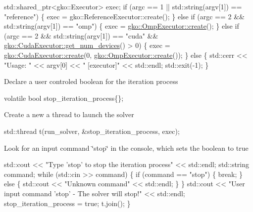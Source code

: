 \begin{DoxyCode}
std::shared\_ptr<gko::Executor> exec;
\textcolor{keywordflow}{if} (argc == 1 || std::string(argv[1]) == \textcolor{stringliteral}{"reference"}) \{
    exec = gko::ReferenceExecutor::create();
\} \textcolor{keywordflow}{else} \textcolor{keywordflow}{if} (argc == 2 && std::string(argv[1]) == \textcolor{stringliteral}{"omp"}) \{
    exec = \hyperlink{classgko_1_1OmpExecutor_a33ca05fdd0fc928ee262fc9425304874}{gko::OmpExecutor::create}();
\} \textcolor{keywordflow}{else} \textcolor{keywordflow}{if} (argc == 2 && std::string(argv[1]) == \textcolor{stringliteral}{"cuda"} &&
           \hyperlink{classgko_1_1CudaExecutor_aef0258494d14de0e56149b920c5173e5}{gko::CudaExecutor::get\_num\_devices}() > 0) \{
    exec = \hyperlink{classgko_1_1CudaExecutor_a2718a92034350650ef406ffdb60db090}{gko::CudaExecutor::create}(0, 
      \hyperlink{classgko_1_1OmpExecutor_a33ca05fdd0fc928ee262fc9425304874}{gko::OmpExecutor::create}());
\} \textcolor{keywordflow}{else} \{
    std::cerr << \textcolor{stringliteral}{"Usage: "} << argv[0] << \textcolor{stringliteral}{" [executor]"} << std::endl;
    std::exit(-1);
\}
\end{DoxyCode}


Declare a user controled boolean for the iteration process


\begin{DoxyCode}
\textcolor{keyword}{volatile} \textcolor{keywordtype}{bool} stop\_iteration\_process\{\};
\end{DoxyCode}


Create a new a thread to launch the solver


\begin{DoxyCode}
std::thread t(run\_solver, &stop\_iteration\_process, exec);
\end{DoxyCode}


Look for an input command \char`\"{}stop\char`\"{} in the console, which sets the boolean to true


\begin{DoxyCode}
    std::cout << \textcolor{stringliteral}{"Type 'stop' to stop the iteration process"} << std::endl;
    std::string command;
    \textcolor{keywordflow}{while} (std::cin >> command) \{
        \textcolor{keywordflow}{if} (command == \textcolor{stringliteral}{"stop"}) \{
            \textcolor{keywordflow}{break};
        \} \textcolor{keywordflow}{else} \{
            std::cout << \textcolor{stringliteral}{"Unknown command"} << std::endl;
        \}
    \}
    std::cout << \textcolor{stringliteral}{"User input command 'stop' - The solver will stop!"}
              << std::endl;
    stop\_iteration\_process = \textcolor{keyword}{true};
    t.join();
\}
\end{DoxyCode}
 \label{_Results}%
